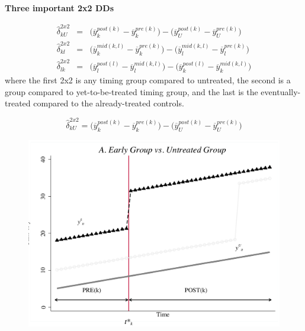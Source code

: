 \documentclass[notes=show]{beamer}
\begin{document}
\begin{frame}[plain]
\begin{center}
\textbf{Three important 2x2 DDs}
\end{center}

\begin{eqnarray*}
\widehat{\delta}^{2x2}_{kU} &=& \bigg ( \overline{y}_k^{post(k)} - \overline{y}_k^{pre(k)} \bigg ) - \bigg ( \overline{y}_U^{post(k)} - \overline{y}_U^{pre(k)} \bigg ) \\
\widehat{\delta}^{2x2}_{kl} &=& \bigg ( \overline{y}_k^{mid(k,l)} - \overline{y}_k^{pre(k)} \bigg ) - \bigg ( \overline{y}_l^{mid(k,l)} - \overline{y}_l^{pre(k)} \bigg ) \\
\widehat{\delta}^{2x2}_{lk} &=& \bigg ( \overline{y}_l^{post(l)} - \overline{y}_l^{mid(k,l)} \bigg ) - \bigg ( \overline{y}_k^{post(l)} - \overline{y}_k^{mid(k,l)} \bigg ) 
\end{eqnarray*}
where the first 2x2 is any timing group compared to untreated, the second is a group compared to yet-to-be-treated timing group, and the last is the eventually-treated compared to the already-treated controls.

\end{frame}


\begin{frame}[plain]
$$\widehat{\delta}^{2x2}_{kU} = \bigg ( \overline{y}_k^{post(k)} - \overline{y}_k^{pre(k)} \bigg ) - \bigg ( \overline{y}_U^{post(k)} - \overline{y}_U^{pre(k)} \bigg ) $$
	\begin{figure}
	\includegraphics[scale=0.5]{./lecture_includes/bacon_goodman_3.png}
	\end{figure}

\end{frame}
\end{document}
